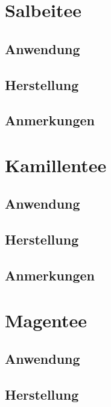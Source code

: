 \section{Salbeitee}

\subsection{Anwendung}

\subsection{Herstellung}

\subsection{Anmerkungen}





\section{Kamillentee}

\subsection{Anwendung}

\subsection{Herstellung}

\subsection{Anmerkungen}






\section{Magentee}

\subsection{Anwendung}

\subsection{Herstellung}

